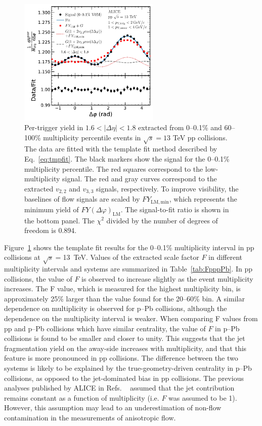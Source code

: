 \begin{figure}[h!]
	\centering
	\hspace{-3em}\includegraphics[width=0.6\textwidth]{figures/FIG2_FlowExt.pdf} 
	\caption{Per-trigger yield in $1.6<|\Delta\eta|<1.8$ extracted from 0--0.1\% and 60--100\% multiplicity percentile events in $\sqrt{s}=13$ TeV pp collisions. The data are fitted with the template fit method described by Eq.~\ref{eq:tmpfit}. The black markers show the signal for the 0--0.1\% multiplicity percentile. The red squares correspond to the low-multiplicity signal. The red and gray curves correspond to the extracted $v_{2,2}$ and $v_{3,3}$ signals, respectively. To improve visibility, the baselines of flow signals are scaled by $FY_{\mathrm{LM,min}}$, which represents the minimum yield of $FY(\Delta\varphi)_{\mathrm{LM}}$. The signal-to-fit ratio is shown in the bottom panel. The $\chi^{2}$ divided by the number of degrees of freedom is 0.894.}
	\label{fig:flowext}
\end{figure}

Figure~\ref{fig:flowext} shows the template fit results for the 0--0.1\% multiplicity interval in pp collisions at $\sqrt{s} = $13~TeV. Values of the extracted scale factor $F$ in different multiplicity intervals and systems are summarized in Table~\ref{tab:FpppPb}. In pp collisions, the value of $F$ is observed to increase slightly as the event multiplicity increases. The F value, which is measured for the highest multiplicity bin, is approximately 25\% larger than the value found for the 20–60\% bin. A similar dependence on multiplicity is observed for p--Pb collisions, although the dependence on the multiplicity interval is weaker. When comparing F values from pp and p–Pb collisions which have similar centrality, the value of $F$ in p--Pb collisions is found to be smaller and closer to unity.
This suggests that the jet fragmentation yield on the away-side increases with multiplicity, and that this feature is more pronounced in pp collisions. The difference between the two systems is likely to be explained by the true-geometry-driven centrality in p--Pb collisions, as opposed to the jet-dominated bias in pp collisions.
The previous analyses published by ALICE in Refs. ~\cite{ALICE:2012eyl,ALICE:2013snk} assumed that the jet contribution remains constant as a function of multiplicity (i.e. $F$ was assumed to be 1). However, this assumption may lead to an underestimation of non-flow contamination in the measurements of anisotropic flow.


